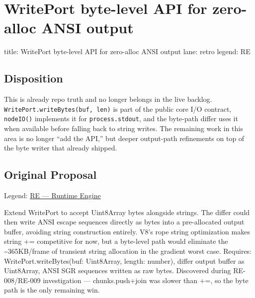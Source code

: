 \chapter{WritePort byte-level API for zero-alloc ANSI output}\label{record-403}

\smallskip

\begin{RecordMeta}
title: WritePort byte-level API for zero-alloc ANSI output
lane: retro
legend: RE

\end{RecordMeta}

\section{Disposition}\label{record-403-disposition}

This is already repo truth and no longer belongs in the live backlog. \texttt{W\allowbreak{}r\allowbreak{}i\allowbreak{}t\allowbreak{}e\allowbreak{}P\allowbreak{}o\allowbreak{}r\allowbreak{}t\allowbreak{}.\allowbreak{}w\allowbreak{}r\allowbreak{}i\allowbreak{}t\allowbreak{}e\allowbreak{}B\allowbreak{}y\allowbreak{}t\allowbreak{}e\allowbreak{}s\allowbreak{}(\allowbreak{}b\allowbreak{}u\allowbreak{}f\allowbreak{},\allowbreak{} \allowbreak{}l\allowbreak{}e\allowbreak{}n\allowbreak{})} is part of the public core I/O contract, \texttt{n\allowbreak{}o\allowbreak{}d\allowbreak{}e\allowbreak{}I\allowbreak{}O\allowbreak{}(\allowbreak{})} implements it for \texttt{p\allowbreak{}r\allowbreak{}o\allowbreak{}c\allowbreak{}e\allowbreak{}s\allowbreak{}s\allowbreak{}.\allowbreak{}s\allowbreak{}t\allowbreak{}d\allowbreak{}o\allowbreak{}u\allowbreak{}t}, and the byte-path differ uses it when available before falling back to string writes. The remaining work in this area is no longer ``add the API,'' but deeper output-path refinements on top of the byte writer that already shipped.

\section{Original Proposal}\label{record-403-original-proposal}

Legend: \href{https://github.com/flyingrobots/bijou/blob/1853ad902f6bf219326409e7f743a5a1d6517dbc/docs/method/legends/RE-runtime-engine.md}{RE --- Runtime Engine}

Extend WritePort to accept Uint8Array bytes alongside strings. The differ could then write ANSI escape sequences directly as bytes into a pre-allocated output buffer, avoiding string construction entirely. V8's rope string optimization makes string += competitive for now, but a byte-level path would eliminate the \textasciitilde365KB/frame of transient string allocation in the gradient worst case. Requires: WritePort.writeBytes(buf: Uint8Array, length: number), differ output buffer as Uint8Array, ANSI SGR sequences written as raw bytes. Discovered during RE-008/RE-009 investigation --- chunks.push+join was slower than +=, so the byte path is the only remaining win.

